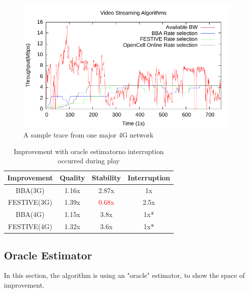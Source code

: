 


\begin{figure}[t]
 \includegraphics[width=\linewidth]{pictures/ATT.pdf}
 \caption{A sample trace from one major 4G network}
\end{figure}

\begin{table}[t]

\begin{tabular} {|c |c |c |c |}
\hline
\textbf{ Improvement} &\textbf{Quality} &\textbf{Stability} & \textbf{Interruption}\\ \hline
BBA(3G)  & 1.16x& 2.87x& 1x \\ \hline
FESTIVE(3G)    & 1.39x & \textcolor{red}{0.68x}&2.5x\\ \hline
BBA(4G) & 1.15x&3.8x& 1x* \\ \hline
FESTIVE(4G) & 1.32x& 3.6x& 1x* \\ \hline
\end{tabular}
\centering
\caption{\large Improvement with oracle estimator\newline \small*no interruption occurred during play} \label{cap:table}
\end{table}



\subsection{Oracle Estimator}\label{sub:oracle}
In this section, the algorithm is using an "oracle" estimator, to show the space of improvement.

